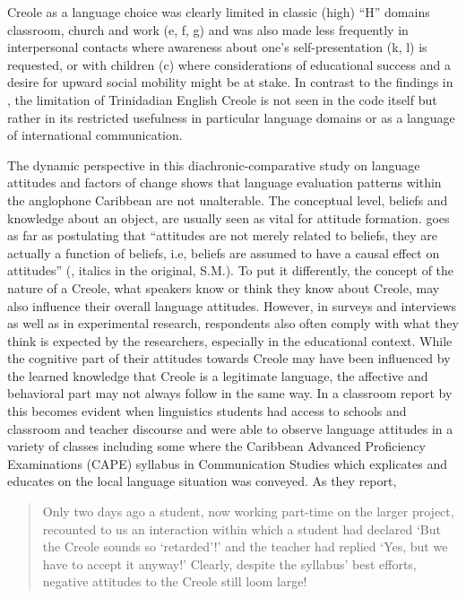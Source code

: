 \documentclass[output=paper,colorlinks,citecolor=brown]{langscibook}
\begin{document}
Creole as a language choice was clearly limited in classic (high) “H” domains classroom, church and work (e, f, g) and was also made less frequently in interpersonal contacts where awareness about one’s self-presentation (k, l) is requested, or with children (c) where considerations of educational success and a desire for upward social mobility might be at stake. In contrast to the findings in \citet{winford1976teacher}, the limitation of Trinidadian English Creole is not seen in the code itself but rather in its restricted usefulness in particular language domains  or as a language of international communication.

The dynamic perspective in this diachronic-comparative study  on language attitudes and factors of change shows that language evaluation patterns within the anglophone Caribbean are not unalterable. The conceptual level, beliefs and knowledge about an object, are usually seen as vital for attitude formation. \citeauthor{ajzen1989attitude} goes as far as postulating that “attitudes are not merely related to beliefs, they are actually a function of beliefs, i.e, beliefs are assumed to have a causal  effect on attitudes” (\citeyear[247]{ajzen1989attitude}, italics in the original, S.M.). To put it differently, the concept of the nature of a Creole, what speakers know or think they know about Creole, may also influence their overall language attitudes. However, in surveys and interviews as well as in experimental research, respondents also often comply with what they think is expected by the researchers, especially in the educational context. While the cognitive part of their attitudes towards Creole may have been influenced by the learned knowledge that Creole is a legitimate language, the affective and behavioral part may not always follow in the same way. In a classroom report by \citet{youssef_deuber2012} this becomes evident when linguistics students had access to schools and classroom and teacher discourse and were able to observe language attitudes in a variety of classes including some where the Caribbean Advanced Proficiency Examinations (CAPE) syllabus in Communication Studies which explicates and educates on the local language situation was conveyed. As they report,


\begin{quote}
    Only two days ago a student, now working part-time on the larger project, recounted to us an interaction within which a student had declared ‘But the Creole sounds so ‘retarded’!’ and the teacher had replied ‘Yes, but we have to accept it anyway!’ Clearly, despite the syllabus’ best efforts, negative attitudes to the Creole still loom large! \citep[5]{youssef_deuber2012}
\end{quote}
\end{document}
